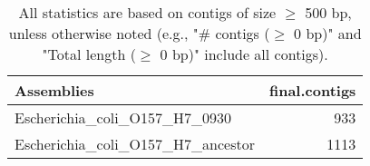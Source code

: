 \documentclass[12pt,a4paper]{article}
\begin{document}
\begin{table}[ht]
\begin{center}
\caption{All statistics are based on contigs of size $\geq$ 500 bp, unless otherwise noted (e.g., "\# contigs ($\geq$ 0 bp)" and "Total length ($\geq$ 0 bp)" include all contigs).}
\begin{tabular}{|l*{1}{|r}|}
\hline
Assemblies & final.contigs \\ \hline
Escherichia\_coli\_O157\_H7\_0930 & 933 \\ \hline
Escherichia\_coli\_O157\_H7\_ancestor & 1113 \\ \hline
\end{tabular}
\end{center}
\end{table}
\end{document}
